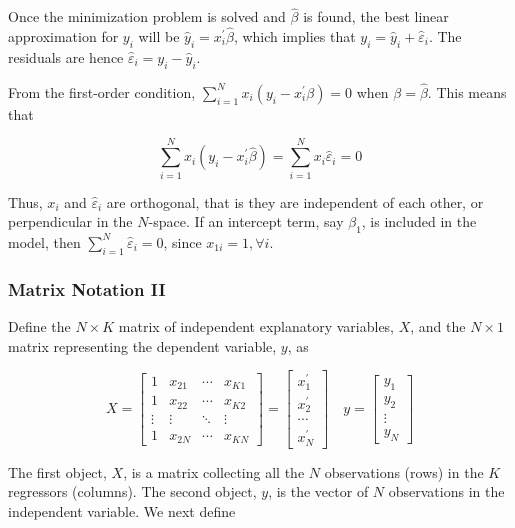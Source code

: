 Once the minimization problem is solved and $\widehat{\beta}$ is found, the best linear approximation for $y_{i}$ will be $\widehat{y}_{i}=x_{i}^{\prime} \widehat{\beta}$, which implies that $y_{i}=\widehat{y}_{i}+\widehat{\varepsilon}_{i}$. The residuals are hence $\widehat{\varepsilon}_{i}=y_{i}-\widehat{y}_{i}$.

From the first-order condition, $\sum_{i=1}^{N} x_{i}\left(y_{i}-x_{i}^{\prime} \beta\right)=0$ when $\beta=\widehat{\beta}$. This means that

$$
\sum_{i=1}^{N} x_{i}\left(y_{i}-x_{i}^{\prime} \widehat{\beta}\right)=\sum_{i=1}^{N} x_{i} \widehat{\varepsilon}_{i}=0
$$

Thus, $x_{i}$ and $\widehat{\varepsilon}_{i}$ are orthogonal, that is they are independent of each other, or perpendicular in the $N$-space. If an intercept term, say $\beta_{1}$, is included in the model, then $\sum_{i=1}^{N} \widehat{\varepsilon}_{i}=0$, since $x_{1 i}=1, \forall i$.

\subsubsection{Matrix Notation II}
Define the $N \times K$ matrix of independent explanatory variables, $X$, and the $N \times 1$ matrix representing the dependent variable, $y$, as

$$
X=\left[\begin{array}{cccc}
1 & x_{21} & \cdots & x_{K 1} \\
1 & x_{22} & \cdots & x_{K 2} \\
\vdots & \vdots & \ddots & \vdots \\
1 & x_{2 N} & \cdots & x_{K N}
\end{array}\right]=\left[\begin{array}{c}
x_{1}^{\prime} \\
x_{2}^{\prime} \\
\cdots \\
x_{N}^{\prime}
\end{array}\right] \quad y=\left[\begin{array}{c}
y_{1} \\
y_{2} \\
\vdots \\
y_{N}
\end{array}\right]
$$

The first object, $X$, is a matrix collecting all the $N$ observations (rows) in the $K$ regressors (columns). The second object, $y$, is the vector of $N$ observations in the independent variable. We next define

